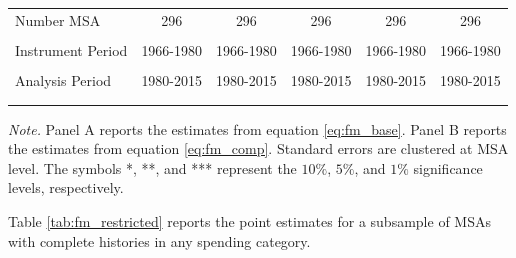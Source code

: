 \documentclass[dv_diss_main.tex]{subfiles}
\begin{document}
\begin{table}[H]
\begin{center}
\begin{tabular}{lccccc}
    Number MSA & 296 & 296 & 296 & 296 & 296 \\
    \vspace{-2pt} & \vspace{-2pt} & \vspace{-2pt} & \vspace{-2pt} & \vspace{-2pt} \\
    Instrument Period & 1966-1980 & 1966-1980 & 1966-1980 & 1966-1980 & 1966-1980 \\
    \vspace{-2pt} & \vspace{-2pt} & \vspace{-2pt} & \vspace{-2pt} & \vspace{-2pt} \\
    Analysis Period & 1980-2015 & 1980-2015 & 1980-2015 & 1980-2015 & 1980-2015 \\ 
    \vspace{-2pt} & \vspace{-2pt} & \vspace{-2pt} & \vspace{-2pt} & \vspace{-2pt} \\ \hline

    \vspace{-2pt} & \vspace{-2pt} & \vspace{-2pt} & \vspace{-2pt} \\
    
    
    \end{tabular}
    \label{tab:fm_percapita}
    \end{center}
        
    \footnotesize{\textit{Note. }Panel A reports the estimates from equation \eqref{eq:fm_base}. Panel B reports the estimates from equation \eqref{eq:fm_comp}. Standard errors are clustered at MSA level. The symbols *, **, and *** represent the $10\%$, $5\%$, and $1\%$ significance levels, respectively.}
\end{table}

\newpage 
Table \ref{tab:fm_restricted} reports the point estimates for a subsample of MSAs with complete histories in any spending category.
\end{document}
